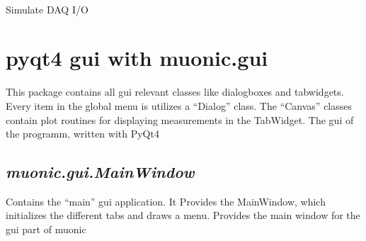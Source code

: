 \documentclass[letterpaper,10pt,english]{sphinxmanual}
\begin{document}

\begin{fulllineitems}
\label{muonic:muonic.daq.SimDaqConnection.SimDaqConnection}~

\begin{fulllineitems}
\label{muonic:muonic.daq.SimDaqConnection.SimDaqConnection.read}
Simulate DAQ I/O

\end{fulllineitems}


\end{fulllineitems}



\section{pyqt4 gui with muonic.gui}
\label{muonic:pyqt4-gui-with-muonic-gui}
This package contains all gui relevant classes like dialogboxes and tabwidgets. Every item in the global menu is utilizes a ``Dialog'' class. The ``Canvas'' classes contain plot routines for displaying measurements in the TabWidget.
\label{muonic:module-muonic.gui}
The gui of the programm, written with PyQt4


\subsection{\emph{muonic.gui.MainWindow}}
\label{muonic:muonic-gui-mainwindow}
Contains the  ``main'' gui application. It Provides the MainWindow, which initializes the different tabs and draws a menu.
\label{muonic:module-muonic.gui.MainWindow}
Provides the main window for the gui part of muonic
\end{document}
